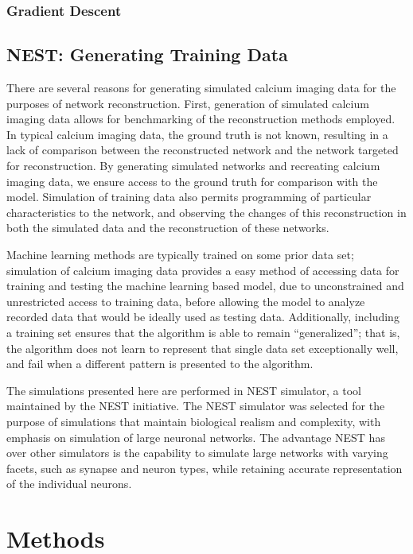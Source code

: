 \documentclass{article}
\begin{document}
\subsubsection{Gradient Descent}


\subsection{NEST: Generating Training Data}
There are several reasons for generating simulated calcium imaging data for the purposes of network reconstruction. First, generation of simulated calcium imaging data allows for benchmarking of the reconstruction methods employed. In typical calcium imaging data, the ground truth is not known, resulting in a lack of comparison between the reconstructed network and the network targeted for reconstruction. By generating simulated networks and recreating calcium imaging data, we ensure access to the ground truth for comparison with the model. Simulation of training data also permits programming of particular characteristics to the network, and observing the changes of this reconstruction in both the simulated data and the reconstruction of these networks.\par
Machine learning methods are typically trained on some prior data set; simulation of calcium imaging data provides a easy method of accessing data for training and testing the machine learning based model, due to unconstrained and unrestricted access to training data, before allowing the model to analyze recorded data that would be ideally used as testing data. Additionally, including a training set ensures that the algorithm is able to remain “generalized”; that is, the algorithm does not learn to represent that single data set exceptionally well, and fail when a different pattern is presented to the algorithm.\par
The simulations presented here are performed in NEST simulator, a tool maintained by the NEST initiative. The NEST simulator was selected for the purpose of simulations that maintain biological realism and complexity, with emphasis on simulation of large neuronal networks. The advantage NEST has over other simulators is the capability to simulate large networks with varying facets, such as synapse and neuron types, while retaining accurate representation of the individual neurons.\par

\section{Methods}
\end{document}
